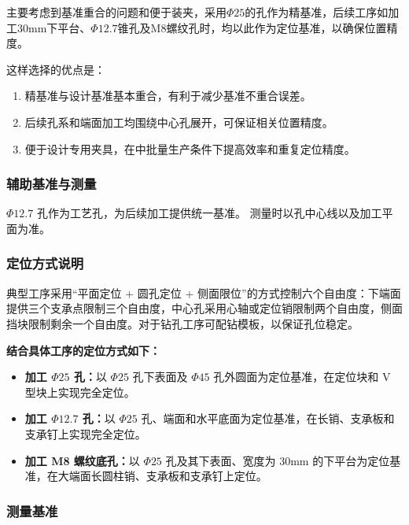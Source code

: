 \documentclass[12pt,a4paper,fontset=none]{ctexart}
\begin{document}
    主要考虑到基准重合的问题和便于装夹，采用$\Phi25$的孔作为精基准，后续工序如加工30mm下平台、$\Phi12.7$锥孔及M8螺纹孔时，均以此作为定位基准，以确保位置精度。

    这样选择的优点是：

    \begin{enumerate}
        \item 精基准与设计基准基本重合，有利于减少基准不重合误差。
        \item 后续孔系和端面加工均围绕中心孔展开，可保证相关位置精度。
        \item 便于设计专用夹具，在中批量生产条件下提高效率和重复定位精度。
    \end{enumerate}

    \subsubsection{辅助基准与测量}

    $\Phi12.7$ 孔作为工艺孔，为后续加工提供统一基准。
    测量时以孔中心线以及加工平面为准。

    \subsubsection{定位方式说明}

    典型工序采用“平面定位 + 圆孔定位 + 侧面限位”的方式控制六个自由度：下端面提供三个支承点限制三个自由度，中心孔采用心轴或定位销限制两个自由度，侧面挡块限制剩余一个自由度。对于钻孔工序可配钻模板，以保证孔位稳定。

    \medskip

    \textbf{结合具体工序的定位方式如下：}

    \begin{itemize}
        \item \textbf{加工 $\Phi25$ 孔：}以 $\Phi25$ 孔下表面及 $\Phi45$ 孔外圆面为定位基准，在定位块和 V 型块上实现完全定位。
        \item \textbf{加工 $\Phi12.7$ 孔：}以 $\Phi25$ 孔、端面和水平底面为定位基准，在长销、支承板和支承钉上实现完全定位。
        \item \textbf{加工 M8 螺纹底孔：}以 $\Phi25$ 孔及其下表面、宽度为 30mm 的下平台为定位基准，在大端面长圆柱销、支承板和支承钉上定位。
    \end{itemize}

    \subsubsection{测量基准}
\end{document}
